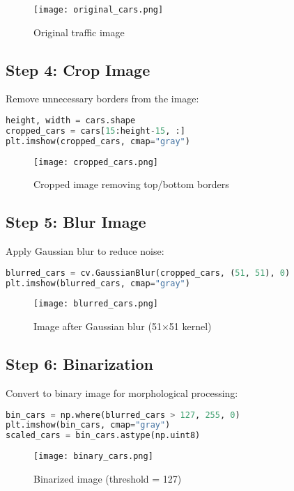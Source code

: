 \documentclass[12pt]{article}
\begin{document}
\begin{figure}[H]
    \centering
    \texttt{[image: original\_cars.png]}
    \caption{Original traffic image}
    \label{fig:original}
\end{figure}

\subsection{Step 4: Crop Image}
Remove unnecessary borders from the image:
\begin{lstlisting}[language=Python]
height, width = cars.shape
cropped_cars = cars[15:height-15, :]
plt.imshow(cropped_cars, cmap="gray")
\end{lstlisting}

\begin{figure}[H]
    \centering
    \texttt{[image: cropped\_cars.png]}
    \caption{Cropped image removing top/bottom borders}
    \label{fig:cropped}
\end{figure}

\subsection{Step 5: Blur Image}
Apply Gaussian blur to reduce noise:
\begin{lstlisting}[language=Python]
blurred_cars = cv.GaussianBlur(cropped_cars, (51, 51), 0)
plt.imshow(blurred_cars, cmap="gray")
\end{lstlisting}

\begin{figure}[H]
    \centering
    \texttt{[image: blurred\_cars.png]}
    \caption{Image after Gaussian blur (51×51 kernel)}
    \label{fig:blurred}
\end{figure}

\subsection{Step 6: Binarization}
Convert to binary image for morphological processing:
\begin{lstlisting}[language=Python]
bin_cars = np.where(blurred_cars > 127, 255, 0)
plt.imshow(bin_cars, cmap="gray")
scaled_cars = bin_cars.astype(np.uint8)
\end{lstlisting}

\begin{figure}[H]
    \centering
    \texttt{[image: binary\_cars.png]}
    \caption{Binarized image (threshold = 127)}
    \label{fig:binary}
\end{figure}
\end{document}

